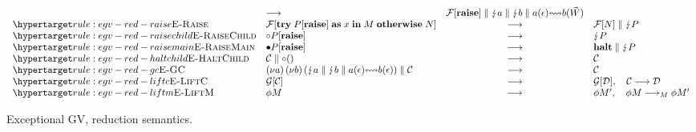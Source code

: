 \begin{figure*}
\begin{mdframed}
\begin{highlight}
\[\begin{array}{llcl}
        & \gvRedArr
        & {\gvPar{\gvPlug{\gvConf{F}}{\gvRaise}}{\gvPar{\gvZap{a}}{%
          \gvPar{\gvZap{b}}{\gvBuf{a}{\gvVecEmp}{b}{\gvVec{W}}}}}}
        \\
        \rlabel{\textsc{E-Raise}}{rule:egv-red-raise}
        & {\gvPlug{\gvConf{F}}{\gvTry{\gvPlug{P}{\gvRaise}}{x}{M}{N}}}
        & \gvRedArr
        & {\gvPar{\gvPlug{\gvConf{F}}{N}}{\gvZap{P}}}
        \\
        \rlabel{\textsc{E-RaiseChild}}{rule:egv-red-raisechild}
        & {\gvChild{\gvPlug{P}{\gvRaise}}}
        & \gvRedArr
        & {\gvZap{P}}
        \\
        \rlabel{\textsc{E-RaiseMain}}{rule:egv-red-raisemain}
        & {\gvMain{\gvPlug{P}{\gvRaise}}}
        & \gvRedArr
        & {\gvPar{\gvHalt}{\gvZap{P}}}
        \\
        \rlabel{\textsc{E-HaltChild}}{rule:egv-red-haltchild}
        & {\gvPar{\gvConf{C}}{\gvChild{\gvUnit}}}
        & \gvRedArr
        & {\tm{\gvConf{C}}}
        \\
        \rlabel{\textsc{E-GC}}{rule:egv-red-gc}
        & {\gvPar{\gvRes{a}{\gvRes{b}{\gvPPar{\gvZap{a}}{\gvPar{\gvZap{b}}{%
          \gvBuf{a}{\gvVecEmp}{b}{\gvVecEmp}}}}}}{\gvConf{C}}}
        & \gvRedArr
        & {\tm{\gvConf{C}}}
        \\
        \rlabel{\textsc{E-LiftC}}{rule:egv-red-liftc}
        & {\gvPlug{\gvConf{G}}{\gvConf{C}}}
        & \gvRedArr
        & {\gvPlug{\gvConf{G}}{\gvConf{D}}},
          \quad{\tm{\gvConf{C}}\gvRedArr\tm{\gvConf{D}}}
        \\
        \rlabel{\textsc{E-LiftM}}{rule:egv-red-liftm}
        & {\gvThread{\phi}{M}}
        & \gvRedArr
        & {\gvThread{\phi}{M'}},
          \quad{\gvThread{\phi}{M}\gvRedArrPure\gvThread{\phi}{M'}}
      \end{array} 
    \]
  \end{highlight}\end{mdframed}
  \caption{Exceptional GV, reduction semantics.}
  \label{fig:egv-reduction}
\end{figure*}

